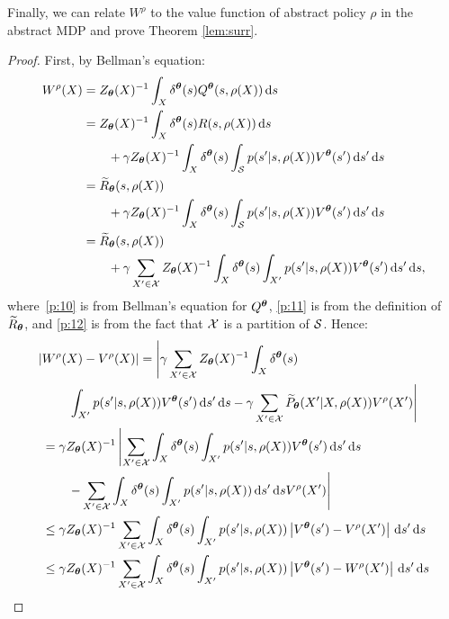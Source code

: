 \noindent Finally, we can relate $W^{\rho}$ to the value function of abstract policy $\rho$ in the abstract \ac{MDP} and prove Theorem \ref{lem:surr}.

\surr*
\begin{proof}
	First, by Bellman's equation:
	\begin{align}
	W^{\rho}(X) 
	&=  Z_{\boldsymbol{\theta}}(X)^{-1}\int_{X}\delta^{\boldsymbol{\theta}}(s)Q^{\boldsymbol{\theta}}(s,\rho(X))\,\mathrm{d} s \nonumber\\
	&= Z_{\boldsymbol{\theta}}(X)^{-1}\int_{X}\delta^{\boldsymbol{\theta}}(s)R(s,\rho(X))\,\mathrm{d} s \nonumber\\
	&\qquad + \gamma Z_{\boldsymbol{\theta}}(X)^{-1} \int_{X}\delta^{\boldsymbol{\theta}}(s)\int_{\mathcal{S}}p(s'|s,\rho(X))V^{\boldsymbol{\theta}}(s')\,\mathrm{d} s'\,\mathrm{d} s \label{p:10}\\
	&= \widetilde{R}_{\boldsymbol{\theta}}(s,\rho(X)) \nonumber\\
	& \qquad + \gamma Z_{\boldsymbol{\theta}}(X)^{-1}\int_{X}\delta^{\boldsymbol{\theta}}(s)\int_{\mathcal{S}}p(s'|s,\rho(X))V^{\boldsymbol{\theta}}(s')\,\mathrm{d} s'\,\mathrm{d} s \label{p:11}\\
	&= \widetilde{R}_{\boldsymbol{\theta}}(s,\rho(X)) \nonumber \\
	&\qquad + \gamma \sum_{X'\in\mathcal{X}} Z_{\boldsymbol{\theta}}(X)^{-1}\int_{X}\delta^{\boldsymbol{\theta}}(s)\int_{X'}p(s'|s,\rho(X))V^{\boldsymbol{\theta}}(s')\,\mathrm{d} s'\,\mathrm{d} s,\label{p:12}
	\end{align}
	where~\eqref{p:10} is from Bellman's equation for $Q^{\boldsymbol{\theta}}$, \eqref{p:11} is from the definition of $\widetilde{R}_{\boldsymbol{\theta}}$, and \eqref{p:12} is from the fact that $\mathcal{X}$ is a partition of $\mathcal{S}$.
	Hence:
	\begin{align}
	|&W^{\rho}(X) - V^{\rho}(X)| 
	= \left|\gamma \sum_{X'\in\Xspace} Z_{\vtheta}(X)^{-1}\int_{X}\delta^{\vtheta}(s)\right. \nonumber\\
	&\qquad\left. \int_{X'}p(s'|s,\rho(X))V^{\vtheta}(s')\de s'\de s	- \gamma\sum_{X'\in\Xspace}\wt{P}_{\vtheta}(X'|X,\rho(X))V^{\rho}(X') \right| \label{p:13}\\
	&= \gamma Z_{\vtheta}(X)^{-1} \left| \sum_{X'\in\Xspace} \int_{X}\delta^{\vtheta}(s)\int_{X'}p(s'|s,\rho(X))V^{\vtheta}(s')\de s'\de s 
	\right.\nonumber\\
	&\qquad\left. - \sum_{X'\in\Xspace}\int_{X}\delta^{\vtheta}(s)\int_{X'}p(s'|s,\rho(X))\de s'\de sV^{\rho}(X') \right| \label{p:14}\\
	&\leq \gamma Z_{\vtheta}(X)^{-1} \sum_{X'\in\Xspace} \int_{X}\delta^{\vtheta}(s)\int_{X'}p(s'|s,\rho(X))\left|V^{\vtheta}(s') - V^{\rho}(X')\right|\de s'\de s \nonumber\\
	&\leq \gamma Z_{\vtheta}(X)^{-1} \sum_{X'\in\Xspace} \int_{X}\delta^{\vtheta}(s)\int_{X'}p(s'|s,\rho(X))\left|V^{\vtheta}(s') - W^{\rho}(X')\right|\de s'\de s \nonumber\\

\end{align}
\end{proof}
